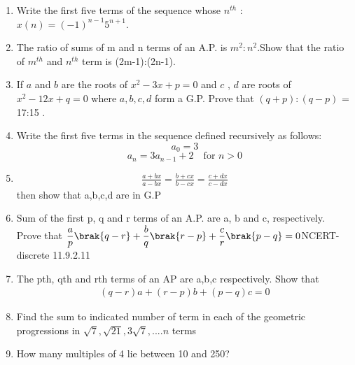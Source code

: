 \begin{enumerate}[label=\thesection.\arabic*,ref=\thesection.\theenumi]
\item Write the first five terms of the sequence whose $n^{th}$  : $x(n) = (-1)^{n-1}5^{n+1}$.\\
\solution
\pagebreak
\item The ratio of sums of m and n terms of an A.P. is $m^2:n^2$.Show
that the ratio of $m^{th}$ and $n^{th}$ term is (2m-1):(2n-1).\\
\solution
\pagebreak

\item If $a$ and $b$ are the roots of $x^{2} -3x + p = 0$ and $c$ , $d$ are roots of $x^{2} - 12x + q = 0$ where $a,b,c,d$ form a G.P. Prove that $(q+p) : (q-p)$ = 17:15 .\\
\solution
\pagebreak


\item Write the first five terms in the sequence defined recursively as follows:
\[ a_{0} = 3 \]
\[ a_{n} = 3a_{n-1} + 2 \quad \text{for } n > 0 \]
\solution 
\pagebreak


\item \begin{align}
\frac{a+bx}{a-bx}=\frac{b+cx}{b-cx}=\frac{c+dx}{c-dx}
\end{align}
then show that a,b,c,d are in G.P\\
\solution

\pagebreak


\item Sum of the first p, q and r terms of an A.P. are a, b and c, respectively.\\
Prove that $\dfrac{a}{p}\brak{q-r}+\dfrac{b}{q}\brak{r-p}+\dfrac{c}{r}\brak{p-q}=0$\hfill{NCERT-discrete 11.9.2.11}\\
\solution

\pagebreak

\item The pth, qth and rth terms of an AP are a,b,c respectively. Show that
\begin{align*} (q-r)a + (r-p)b +(p-q)c =0 \end{align*}
\solution
\pagebreak
\item Find the sum to indicated number of term in each of the geometric progressions in $\sqrt{7} ,\sqrt{21} , 3\sqrt{7}, ....n$ terms\\
\solution


\item How many multiples of 4 lie between 10 and 250?\\
\solution
\pagebreak


\end{enumerate}
